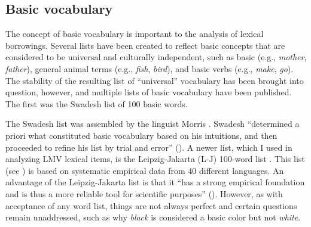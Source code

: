 \documentclass[output=paper]{LSP/langsci}
\begin{document}
\subsection{Basic vocabulary}

	The concept of basic vocabulary is important to the analysis of lexical borrowings. Several lists have been created to reflect basic concepts that are considered to be universal and culturally independent, such as basic  (e.g., \emph{mother}, \emph{father}), general animal terms (e.g., \emph{fish}, \emph{bird}), and basic verbs (e.g., \emph{make}, \emph{go}). The stability of the resulting list of “universal” vocabulary has been brought into question, however, and multiple lists of basic vocabulary have been published. The first was the Swadesh list of 100 basic words.

	The Swadesh list was assembled by the linguist Morris \citet{Swadesh1971}. Swadesh “determined a priori what constituted basic vocabulary based on his intuitions, and then proceeded to refine his list by trial and error” (\citealt[230]{Tadmoretal2010}). A newer list, which I used in analyzing LMV lexical items, is the Leipzig-Jakarta (L-J) 100-word list \citep{HaspelmathTadmor2009}. This list (see ) is based on systematic empirical data from 40 different languages. An advantage of the Leipzig-Jakarta list is that it ``has a strong empirical foundation and is thus a more reliable tool for scientific purposes” (\citealt[230]{Tadmoretal2010}). However, as with acceptance of any word list, things are not always perfect and certain questions remain unaddressed, such as why \emph{black} is considered a basic color but not \emph{white}.
\end{document}

